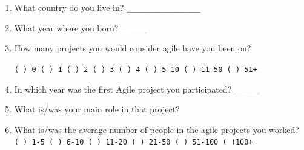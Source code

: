 \documentclass[lnbip]{svmultln}
\begin{document}
\begin{small}
  \begin{enumerate}
  \item What country do you live in? \verb=_________________=
    \vspace{8pt}

  \item What year where you born? \verb=______= \vspace{8pt}

  \item How many projects you would consider agile have you been on?

    \verb=( ) 0 ( ) 1 ( ) 2 ( ) 3 ( ) 4 ( ) 5-10 ( ) 11-50 ( ) 51+=
    \vspace{8pt}

  \item In which year was the first Agile project you participated?
    \verb=______= \vspace{8pt}

  \item What is/was your main role in that project?
    \vspace{8pt}

  \item What is/was the average number of people in the agile projects
    you worked?
    \verb=( ) 1-5 ( ) 6-10 ( ) 11-20 ( ) 21-50 ( ) 51-100 ( )100+=
    \vspace{8pt}


\end{enumerate}
\end{small}
\end{document}
